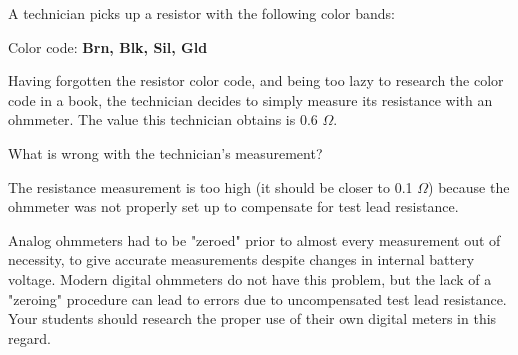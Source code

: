

A technician picks up a resistor with the following color bands:

\vskip 10pt

\noindent
Color code: {\bf Brn, Blk, Sil, Gld}

\vskip 10pt

Having forgotten the resistor color code, and being too lazy to research the color code in a book, the technician decides to simply measure its resistance with an ohmmeter.  The value this technician obtains is 0.6 $\Omega$.

What is wrong with the technician's measurement?







The resistance measurement is too high (it should be closer to 0.1 $\Omega$) because the ohmmeter was not properly set up to compensate for test lead resistance.







Analog ohmmeters had to be "zeroed" prior to almost every measurement out of necessity, to give accurate measurements despite changes in internal battery voltage.  Modern digital ohmmeters do not have this problem, but the lack of a "zeroing" procedure can lead to errors due to uncompensated test lead resistance.  Your students should research the proper use of their own digital meters in this regard.




